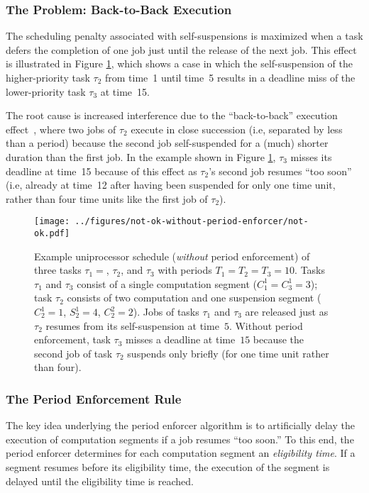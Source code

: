 \subsubsection{The Problem: Back-to-Back Execution}

The scheduling penalty associated with self-suspensions is maximized when a task defers the completion of one job just until the release of the next job.  This effect is illustrated in Figure \ref{fig:not-ok-without-period-enforcement}, which shows a case in which the self-suspension of the higher-priority task $\tau_2$ from time~1 until time~5  results in a deadline miss of the lower-priority task $\tau_3$ at time~15.

The root cause is increased interference due to the ``back-to-back'' execution effect~\cite{LSS:87,LSST:91,Ra:90,ABRTW:93,SLS:95}, where two jobs of $\tau_2$ execute in close succession (i.e, separated by less than a period) because the second job self-suspended for a (much) shorter duration than the first job. In the example shown in Figure \ref{fig:not-ok-without-period-enforcement},  $\tau_3$ misses its deadline at time~15 because of this effect as $\tau_2$'s second job resumes ``too soon'' (i.e, already at time~12 after having been suspended for only one time unit, rather than four time units like the first job of $\tau_2$). 

\begin{figure}[t]
  \centering
  \texttt{[image: ../figures/not-ok-without-period-enforcer/not-ok.pdf]}
  \caption{Example uniprocessor schedule (\emph{without} period enforcement) of three tasks $\tau_1 = $, $\tau_2$, and $\tau_3$ with periods $T_1 = T_2 = T_3 = 10$. Tasks $\tau_1$ and $\tau_3$ consist of a single computation segment ($C_1^1 = C_3^1 = 3$); task $\tau_2$ consists of two computation and one suspension segment ($C_2^1 = 1$, $S_2^1 = 4$, $C_2^2 = 2$). Jobs of tasks $\tau_1$ and $\tau_3$ are released just as $\tau_2$ resumes from its self-suspension at time~$5$. Without period enforcement, task $\tau_3$ misses a deadline at time~$15$ because the second job of  task $\tau_2$ suspends only briefly (for one time unit rather than four).}
  \label{fig:not-ok-without-period-enforcement}
\end{figure}

\subsubsection{The Period Enforcement Rule}

The key idea underlying the period enforcer algorithm is to artificially delay the execution of computation segments if a job resumes ``too soon.'' To this end,  the period enforcer determines for each computation segment an \emph{eligibility time}. If a segment resumes  before its eligibility time, the execution of the segment is delayed until the eligibility time is reached.

